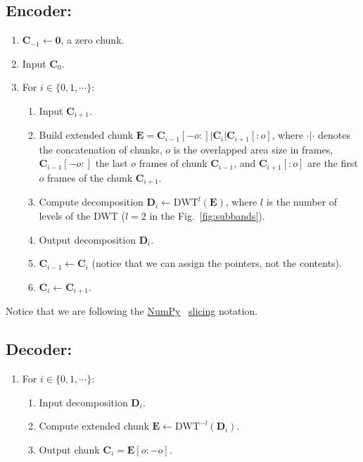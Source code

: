 \subsection*{Encoder:}
\begin{enumerate}
\item ${\mathbf C}_{-1}\leftarrow{\mathbf 0}$, a zero chunk.
\item Input ${\mathbf C}_0$.
\item For $i\in\{0,1,\cdots\}$:   
  \begin{enumerate}               
  \item Input ${\mathbf C}_{i+1}$.
  \item Build extended chunk ${\mathbf E}={\mathbf
    C}_{i-1}[-o:]|{\mathbf C}_i|{\mathbf C}_{i+1}[:o]$, where
    $\cdot|\cdot$ denotes the concatenation of chunks, $o$ is the
    overlapped area size in frames, ${\mathbf C}_{i-1}[-o:]$ the last
    $o$ frames of chunk ${\mathbf C}_{i-1}$, and ${\mathbf
      C}_{i+1}[:o]$ are the first $o$ frames of the chunk ${\mathbf
      C}_{i+1}$.
  \item Compute decomposition ${\mathbf D}_i \leftarrow
    \text{DWT}^l({\mathbf E})$, where $l$ is the number of levels of
    the DWT ($l=2$ in the Fig.~\ref{fig:subbands}).
  \item Output decomposition ${\mathbf D}_i$.
  \item ${\mathbf C}_{i-1}\leftarrow {\mathbf C}_i$ (notice that we can assign the pointers, not the contents).
  \item ${\mathbf C}_i\leftarrow {\mathbf C}_{i+1}$.
  \end{enumerate}
\end{enumerate}

Notice that we are following the
\href{https://numpy.org/doc/stable/reference/}{NumPy}~\cite{numpy,harris2020array}
\href{https://www.pythoninformer.com/python-libraries/numpy/index-and-slice/}{slicing}
notation.


\subsection*{Decoder:}
\begin{enumerate}
\item For $i\in\{0,1,\cdots\}$:
  \begin{enumerate}
  \item Input decomposition ${\mathbf D}_i$.
  \item Compute extended chunk ${\mathbf E}\leftarrow\text{DWT}^{-l}({\mathbf D}_i)$.
  \item Output chunk ${\mathbf C}_i={\mathbf E}[o:-o]$.
  \end{enumerate}
\end{enumerate}

